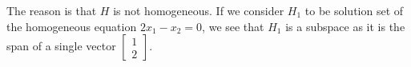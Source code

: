 \documentclass{beamer}
\theoremstyle{definition}
\theoremstyle{remark}
\begin{document}
\begin{frame}[t]
\begin{example}
The reason is that $H$ is not homogeneous. If we consider $H_1$ to be solution set of the homogeneous equation $2x_1-x_2=0$, we see that $H_1$ is a subspace as it is the span of a single vector $\begin{bmatrix}
1\\2
\end{bmatrix}$.
\end{example}
\end{frame}


\end{document}

